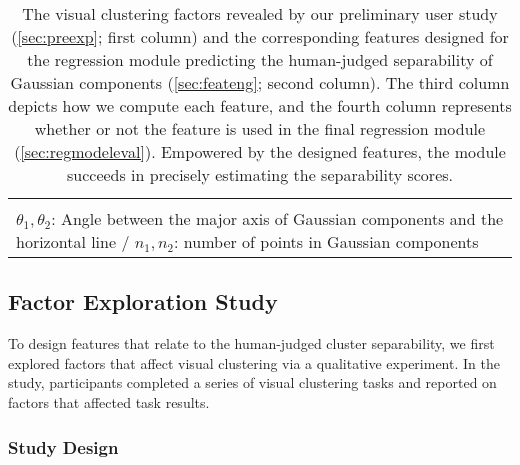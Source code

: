{\begin{table*}[t]
{\begin{tabular}{c|lllc}
{         \vspace{-1.78mm}
        } \\ 
        \multicolumn{5}{l}{
        \footnotesize
        $\theta_1, \theta_2$: 
Angle between the major axis of Gaussian components and the horizontal line / $n_1, n_2$: number of points in Gaussian components
        }
    \end{tabular}
    }
    \vspace{-2mm}
    \caption{The 
    visual clustering factors revealed by our preliminary user study (\autoref{sec:preexp}; first column) and the corresponding features designed for the regression module predicting the human-judged separability of Gaussian components (\autoref{sec:feateng}; second column). The third column depicts how we compute each feature, and the fourth column represents whether or not the feature is used in the final regression module (\autoref{sec:regmodeleval}). Empowered by the designed features, the module succeeds in precisely estimating the separability scores.  \vspace{-4mm}}
    \label{tab:feature_eng}
\end{table*}

}



\subsection{Factor Exploration Study}
\label{sec:preexp}

To design features that relate to the human-judged cluster separability,
we first explored 
factors that affect visual clustering via a qualitative experiment. In the study, 
participants completed a series of visual clustering tasks and reported on 
factors that affected task results. 

\subsubsection{Study Design}

